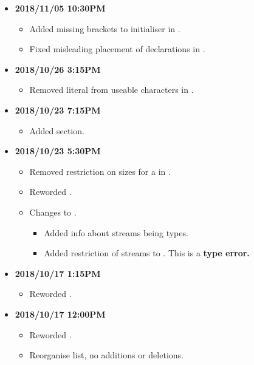 \documentclass[../gazprea.tex]{subfiles}
\begin{document}
\begin{itemize}
  \item
    \textbf{2018/11/05 10:30PM}
    \begin{itemize}
      \item Added missing brackets to  initialiser in .
      \item Fixed misleading placement of declarations in .
    \end{itemize}
  \item
    \textbf{2018/10/26 3:15PM}
    \begin{itemize}
      \item Removed literal \code{\\n} from useable characters in .
    \end{itemize}
  \item
    \textbf{2018/10/23 7:15PM}
    \begin{itemize}
      \item Added  section.
    \end{itemize}
  \item
    \textbf{2018/10/23 5:30PM}
    \begin{itemize}
      \item Removed restriction on sizes for a  in .
      \item Reworded .
      \item Changes to .
      \begin{itemize}
        \item Added info about streams being types.
        \item Added restriction of streams to .
          This is a \textbf{type error.}
      \end{itemize}
    \end{itemize}
  \item
    \textbf{2018/10/17 1:15PM}
    \begin{itemize}
      \item Reworded .
    \end{itemize}
  \item
    \textbf{2018/10/17 12:00PM}
    \begin{itemize}
      \item Reworded .
      \item Reorganise  list, no additions or deletions.

\end{itemize}
\end{itemize}
\end{document}
